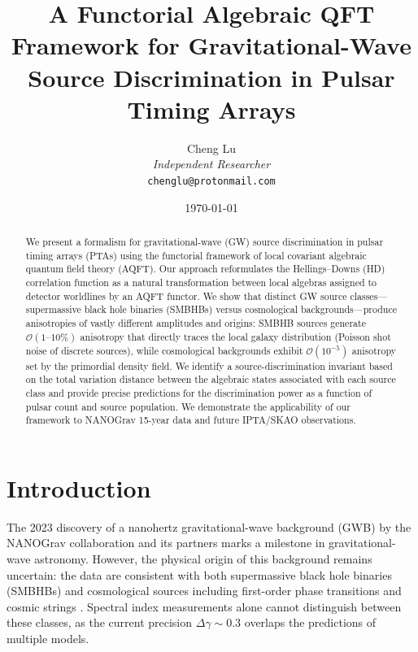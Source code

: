 \documentclass[11pt,a4paper]{article}
\title{\textbf{A Functorial Algebraic QFT Framework for Gravitational-Wave Source Discrimination in Pulsar Timing Arrays}}
\author{Cheng Lu\\
\textit{Independent Researcher}\\
\vspace{0.5em}
\texttt{chenglu@protonmail.com}
}
\date{\today}
\begin{document}
\maketitle

\begin{abstract}
We present a formalism for gravitational-wave (GW) source discrimination in pulsar timing arrays (PTAs) using the functorial framework of local covariant algebraic quantum field theory (AQFT). Our approach reformulates the Hellings--Downs (HD) correlation function as a natural transformation between local algebras assigned to detector worldlines by an AQFT functor. We show that distinct GW source classes---supermassive black hole binaries (SMBHBs) versus cosmological backgrounds---produce anisotropies of vastly different amplitudes and origins: SMBHB sources generate $\mathcal{O}(1\text{--}10\%)$ anisotropy that directly traces the local galaxy distribution (Poisson shot noise of discrete sources), while cosmological backgrounds exhibit $\mathcal{O}(10^{-5})$ anisotropy set by the primordial density field. We identify a source-discrimination invariant based on the total variation distance between the algebraic states associated with each source class and provide precise predictions for the discrimination power as a function of pulsar count and source population. We demonstrate the applicability of our framework to NANOGrav 15-year data and future IPTA/SKAO observations.




\end{abstract}



\section{Introduction}\label{sec:intro}

The 2023 discovery of a nanohertz gravitational-wave background (GWB) by the NANOGrav collaboration and its partners \cite{Agazie:2023} marks a milestone in gravitational-wave astronomy. However, the physical origin of this background remains uncertain: the data are consistent with both supermassive black hole binaries (SMBHBs) \cite{Agazie:2023} and cosmological sources including first-order phase transitions \cite{Caprini:2020} and cosmic strings \cite{Vilenkin:1984}. Spectral index measurements alone cannot distinguish between these classes, as the current precision $\Delta\gamma \sim 0.3$ overlaps the predictions of multiple models.
\end{document}
